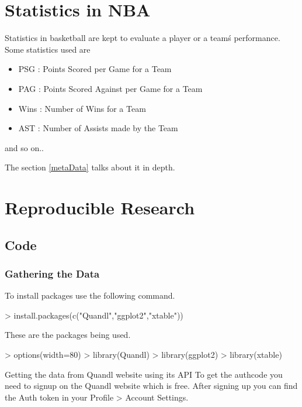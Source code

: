 \documentclass[a4paper]{article}
\begin{document}
\section{Statistics in NBA}
Statistics in basketball are kept to evaluate a player or a team\'s performance.
Some statistics used are
\begin{itemize}
\item PSG : Points Scored per Game for a Team
\item PAG : Points Scored Against per Game for a Team
\item Wins : Number of Wins for a Team
\item AST : Number of Assists made by the Team 
\end{itemize}
and so on..

The section \ref{metaData} talks about it in depth.


\section{Reproducible Research}

\subsection{Code}
\subsubsection{Gathering the Data}

To install packages use the following command.

\begin{Schunk}
\begin{Sinput}
> install.packages(c("Quandl","ggplot2","xtable"))
\end{Sinput}
\end{Schunk}

These are the packages being used. 

\begin{Schunk}
\begin{Sinput}
> options(width=80)
> library(Quandl)
> library(ggplot2)
> library(xtable)
\end{Sinput}
\end{Schunk}

Getting the data from Quandl website using its API
To get the authcode you need to signup on the Quandl website which is free. After signing up you can find the Auth token in your Profile > Account Settings.
\end{document}
